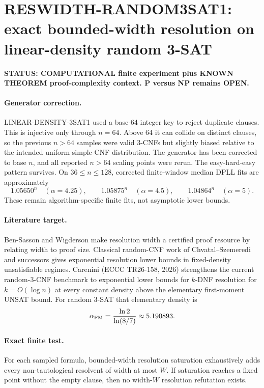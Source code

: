 \section*{RESWIDTH-RANDOM3SAT1: exact bounded-width resolution on linear-density random 3-SAT}

\textbf{STATUS: COMPUTATIONAL finite experiment plus KNOWN THEOREM proof-complexity context. P versus NP remains OPEN.}

\paragraph{Generator correction.}
LINEAR-DENSITY-3SAT1 used a base-64 integer key to reject duplicate clauses. This is
injective only through \(n=64\). Above 64 it can collide on distinct clauses, so the
previous \(n>64\) samples were valid 3-CNFs but slightly biased relative to the intended
uniform simple-CNF distribution. The generator has been corrected to base \(n\), and all
reported \(n>64\) scaling points were rerun. The easy-hard-easy pattern survives. On
\(36\le n\le128\), corrected finite-window median DPLL fits are approximately
\[
1.05650^n\quad(\alpha=4.25),\qquad
1.05875^n\quad(\alpha=4.5),\qquad
1.04864^n\quad(\alpha=5).
\]
These remain algorithm-specific finite fits, not asymptotic lower bounds.

\paragraph{Literature target.}
Ben-Sasson and Wigderson make resolution width a certified proof resource by relating
width to proof size. Classical random-CNF work of Chvatal--Szemeredi and successors gives
exponential resolution lower bounds in fixed-density unsatisfiable regimes. Carenini
(ECCC TR26-158, 2026) strengthens the current random-3-CNF benchmark to exponential
lower bounds for \(k\)-DNF resolution for \(k=O(\log n)\) at every constant density
above the elementary first-moment UNSAT bound. For random 3-SAT that elementary density is
\[
\alpha_{\rm FM}=\frac{\ln2}{\ln(8/7)}\approx5.190893.
\]

\paragraph{Exact finite test.}
For each sampled formula, bounded-width resolution saturation exhaustively adds every
non-tautological resolvent of width at most \(W\). If saturation reaches a fixed point
without the empty clause, then no width-\(W\) resolution refutation exists.

